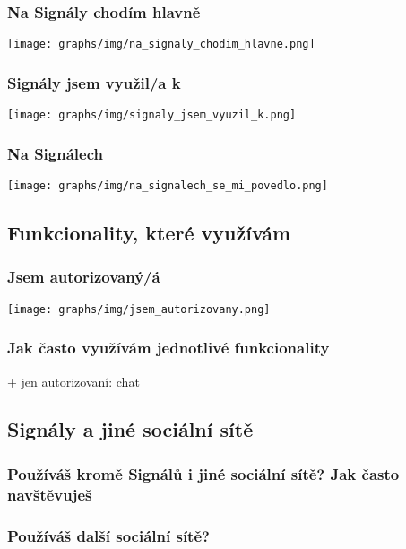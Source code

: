 \documentclass[12pt, a4paper, twoside]{article}
\begin{document}
\subsubsection{Na Signály chodím hlavně}

\texttt{[image: graphs/img/na\_signaly\_chodim\_hlavne.png]}

\subsubsection{Signály jsem využil/a k}

\texttt{[image: graphs/img/signaly\_jsem\_vyuzil\_k.png]}

\subsubsection{Na Signálech }

\texttt{[image: graphs/img/na\_signalech\_se\_mi\_povedlo.png]}

\subsection{Funkcionality, které využívám}\label{sec:funkcionality}

\subsubsection{Jsem autorizovaný/á}

\texttt{[image: graphs/img/jsem\_autorizovany.png]}

\subsubsection{Jak často využívám jednotlivé funkcionality}

+ jen autorizovaní: chat

\subsection{Signály a jiné sociální sítě}\label{sec:jinesite}

\subsubsection{Používáš kromě Signálů i jiné sociální sítě? Jak často navštěvuješ}

\subsubsection{Používáš další sociální sítě?}
\end{document}
